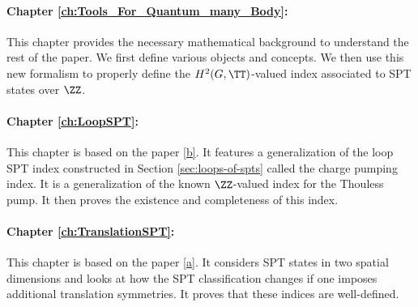 \paragraph{Chapter \ref{ch:Tools_For_Quantum_many_Body}:}This chapter provides the necessary mathematical background to understand the rest of the paper. We first define various objects and concepts. We then use this new formalism to properly define the $H^2(G,\TT)$-valued index associated to SPT states over $\ZZ$.
\paragraph{Chapter \ref{ch:LoopSPT}:}This chapter is based on the paper \hyperref[mySecondPaper]{[b]}. It features a generalization of the loop SPT index constructed in Section \ref{sec:loops-of-spts} called the charge pumping index. It is a generalization of the known $\ZZ$-valued index for the Thouless pump. It then proves the existence and completeness of this index.
\paragraph{Chapter \ref{ch:TranslationSPT}:}This chapter is based on the paper \hyperref[myFirstPaper]{[a]}. It considers SPT states in two spatial dimensions and looks at how the SPT classification changes if one imposes additional translation symmetries. It proves that these indices are well-defined.

\cleardoublepage


